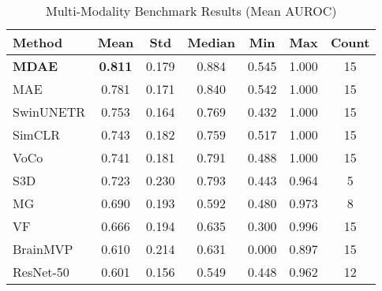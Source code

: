 \begin{table}[h]
\centering
\caption{Multi-Modality Benchmark Results (Mean AUROC)}
\begin{tabular}{lcccccc}
\toprule
Method & Mean & Std & Median & Min & Max & Count \\
\midrule
\textbf{MDAE} & \textbf{0.811} & 0.179 & 0.884 & 0.545 & 1.000 & 15 \\
MAE & 0.781 & 0.171 & 0.840 & 0.542 & 1.000 & 15 \\
SwinUNETR & 0.753 & 0.164 & 0.769 & 0.432 & 1.000 & 15 \\
SimCLR & 0.743 & 0.182 & 0.759 & 0.517 & 1.000 & 15 \\
VoCo & 0.741 & 0.181 & 0.791 & 0.488 & 1.000 & 15 \\
S3D & 0.723 & 0.230 & 0.793 & 0.443 & 0.964 & 5 \\
MG & 0.690 & 0.193 & 0.592 & 0.480 & 0.973 & 8 \\
VF & 0.666 & 0.194 & 0.635 & 0.300 & 0.996 & 15 \\
BrainMVP & 0.610 & 0.214 & 0.631 & 0.000 & 0.897 & 15 \\
ResNet-50 & 0.601 & 0.156 & 0.549 & 0.448 & 0.962 & 12 \\
\bottomrule
\end{tabular}
\end{table}